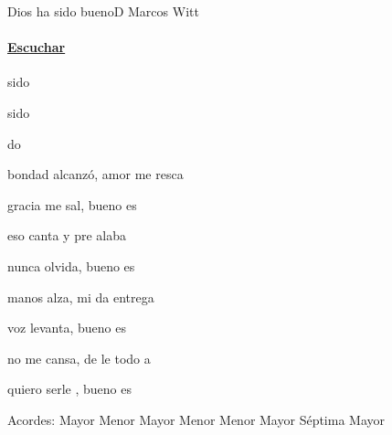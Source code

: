 \documentclass[12pt, spanish]{book}
\newcommand{\NotCCLIed}{\relax}
\begin{document}
    \begin{song}{Dios ha sido bueno}{D}
        {} %
        {Marcos Witt}
        {} %
        {} %
        \ifChordBk
        \paragraph{\mbox{}\hfill\protect\href{https://open.spotify.com/intl-es/track/1SvyN5M5IjkUPhu1Voocri}{Escuchar}\mbox{}\hfill}
        \fi

        \begin{SBOpGroup}
                sido  

                sido 

                  do  

               
        \end{SBOpGroup}

        \begin{SBOpGroup}
             bondad  alcanzó,  amor me resca

             gracia me sal, bueno es 


             eso canta y pre alaba

             nunca olvida, bueno es 
        \end{SBOpGroup}

        \begin{SBChorus}
             manos alza,  mi da entrega

             voz levanta, bueno es 


             no me cansa, de le todo a 

             quiero serle , bueno es 
        \end{SBChorus}

        \ifChordBk
        \begin{SBOpGroup}
            Acordes:\break
             Mayor \hfill
             Menor \hfill\null\break
             Mayor \hfill
             Menor \hfill\null\break
             Menor \hfill
             Mayor S\'eptima \hfill\null\break
             Mayor \hfill
        \end{SBOpGroup}
        \fi
    \end{song}
\end{document}
